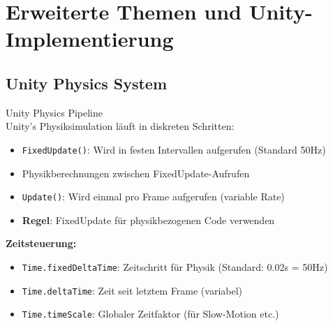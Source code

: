 \section{Erweiterte Themen und Unity-Implementierung}

\subsection{Unity Physics System}

\begin{concept}{Unity Physics Pipeline}\\
    Unity's Physiksimulation läuft in diskreten Schritten:
    \begin{itemize}
        \item \texttt{FixedUpdate()}: Wird in festen Intervallen aufgerufen (Standard 50Hz)
        \item Physikberechnungen zwischen FixedUpdate-Aufrufen
        \item \texttt{Update()}: Wird einmal pro Frame aufgerufen (variable Rate)
        \item \textbf{Regel}: FixedUpdate für physikbezogenen Code verwenden
    \end{itemize}
    
    \textbf{Zeitsteuerung:}
    \begin{itemize}
        \item \texttt{Time.fixedDeltaTime}: Zeitschritt für Physik (Standard: 0.02s = 50Hz)
        \item \texttt{Time.deltaTime}: Zeit seit letztem Frame (variabel)
        \item \texttt{Time.timeScale}: Globaler Zeitfaktor (für Slow-Motion etc.)
    \end{itemize}
\end{concept}

